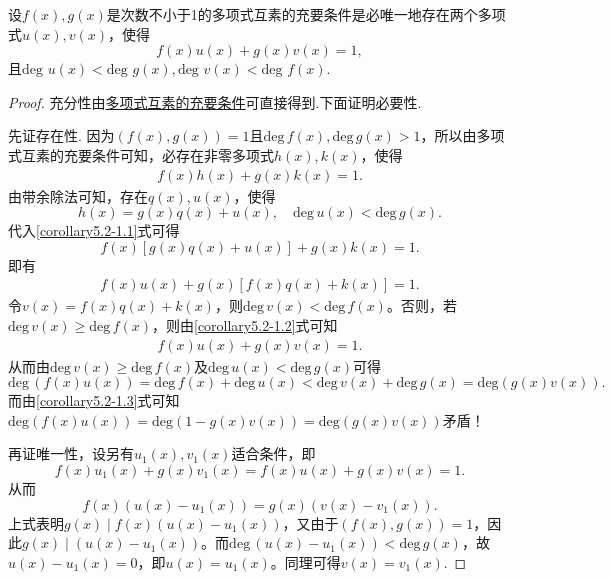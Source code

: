 \documentclass[../../main.tex]{subfiles}%
\begin{document}
\begin{corollary}\label{corollary:次数不小于1的多项式互素的充要条件}
设\(f(x),g(x)\)是次数不小于1的多项式互素的充要条件是必唯一地存在两个多项式\(u(x),v(x)\)，使得
\[
f(x)u(x)+g(x)v(x)=1,
\]
且\(\text{deg }u(x)<\text{deg }g(x),\text{deg }v(x)<\text{deg }f(x)\).
\end{corollary}
\begin{proof}
充分性由\hyperref[theorem:多项式互素的充要条件]{多项式互素的充要条件}可直接得到.下面证明必要性.

先证存在性.
因为\(( f(x),g(x) ) = 1\)且\(\mathrm{deg}\,f(x),\mathrm{deg}\,g(x) > 1\)，所以由多项式互素的充要条件可知，必存在非零多项式\(h(x),k(x)\)，使得
\begin{align}
f(x)h(x)+g(x)k(x)=1. \label{corollary5.2-1.1} 
\end{align}
由带余除法可知，存在\(q(x),u(x)\)，使得
\[
h(x)=g(x)q(x)+u(x),\quad \mathrm{deg}\,u(x)<\mathrm{deg}\,g(x).
\]
代入\eqref{corollary5.2-1.1}式可得
\[
f(x)[g(x)q(x)+u(x)]+g(x)k(x)=1.
\]
即有
\begin{align}
f(x)u(x)+g(x)[f(x)q(x)+k(x)] = 1. \label{corollary5.2-1.2}  
\end{align}
令\(v(x)=f(x)q(x)+k(x)\)，则\(\mathrm{deg}\,v(x)<\mathrm{deg}\,f(x)\)。否则，若\(\mathrm{deg}\,v(x)\geqslant \mathrm{deg}\,f(x)\)，则由\eqref{corollary5.2-1.2}式可知
\begin{align}
f(x)u(x)+g(x)v(x)=1. \label{corollary5.2-1.3}  
\end{align}
从而由\(\mathrm{deg}\,v(x)\geqslant \mathrm{deg}\,f(x)\)及\(\mathrm{deg}\,u(x)<\mathrm{deg}\,g(x)\)可得
\[
\mathrm{deg}\,(f(x)u(x))=\mathrm{deg}\,f(x)+\mathrm{deg}\,u(x)<\mathrm{deg}\,v(x)+\mathrm{deg}\,g(x)=\mathrm{deg}(g(x)v(x)).
\]
而由\eqref{corollary5.2-1.3}式可知\(\mathrm{deg}\left( f\left( x \right) u\left( x \right) \right) =\mathrm{deg}\left( 1-g\left( x \right) v\left( x \right) \right) =\mathrm{deg}\left( g\left( x \right) v\left( x \right) \right) \)矛盾！

再证唯一性，设另有\(u_1(x),v_1(x)\)适合条件，即
\[
f(x)u_1(x)+g(x)v_1(x)=f(x)u(x)+g(x)v(x)=1.
\]
从而
\[
f(x)(u(x)-u_1(x))=g(x)(v(x)-v_1(x)).
\]
上式表明\(g(x)\mid f(x)(u(x)-u_1(x))\)，又由于\(( f(x),g(x) ) = 1\)，因此\(g(x)\mid (u(x)-u_1(x))\)。而\(\mathrm{deg}\,(u(x)-u_1(x))<\mathrm{deg}\,g(x)\)，故\(u(x)-u_1(x)=0\)，即\(u(x)=u_1(x)\)。同理可得\(v(x)=v_1(x)\).
\end{proof}
\end{document}
